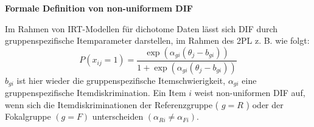 \documentclass[10pt, letterpaper]{article}
\begin{document}
\textbf{Formale Definition von non-uniformem DIF}

Im Rahmen von IRT-Modellen für dichotome Daten lässt sich DIF durch gruppenspezifische Itemparameter darstellen, im Rahmen des 2PL z. B. wie folgt:
$$
P\left(x_{i j}=1\right)=\frac{\exp \left(\alpha_{g i}\left(\theta_j-b_{g i}\right)\right)}{1+\exp \left(\alpha_{g i}\left(\theta_j-b_{g i}\right)\right)}
$$
$b_{g i}$ ist hier wieder die gruppenspezifische Itemschwierigkeit, $\alpha_{g i}$ eine gruppenspezifische Itemdiskrimination. Ein Item $i$ weist non-uniformen DIF auf, wenn sich die Itemdiskriminationen der Referenzgruppe ( $g=R$ ) oder der Fokalgruppe $(g=F)$ unterscheiden $\left(\alpha_{R i} \neq \alpha_{F i}\right)$.
\end{document}
